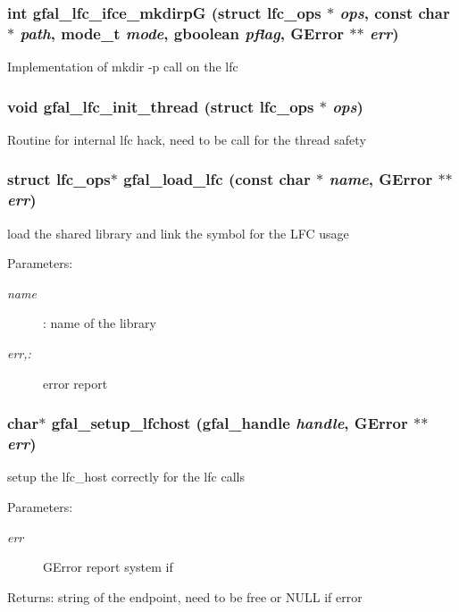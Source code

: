 \subsubsection{\setlength{\rightskip}{0pt plus 5cm}int gfal\_\-lfc\_\-ifce\_\-mkdirp\-G (struct lfc\_\-ops $\ast$ {\em ops}, const char $\ast$ {\em path}, mode\_\-t {\em mode}, gboolean {\em pflag}, GError $\ast$$\ast$ {\em err})}\label{lfc__ifce__ng_8h_9fa43925882e2e196e0020b529827d3c}


Implementation of mkdir -p call on the lfc 
\subsubsection{\setlength{\rightskip}{0pt plus 5cm}void gfal\_\-lfc\_\-init\_\-thread (struct lfc\_\-ops $\ast$ {\em ops})}\label{lfc__ifce__ng_8h_aed5d8ab4c88e918990444e53930bfa4}


Routine for internal lfc hack, need to be call for the thread safety 
\subsubsection{\setlength{\rightskip}{0pt plus 5cm}struct lfc\_\-ops$\ast$ gfal\_\-load\_\-lfc (const char $\ast$ {\em name}, GError $\ast$$\ast$ {\em err})}\label{lfc__ifce__ng_8h_7c91643749a2c5d7e8043c0e42d00fd6}


load the shared library and link the symbol for the LFC usage \begin{Desc}
\item[Parameters:]
\begin{description}
\item[{\em name}]: name of the library \item[{\em err,:}]error report \end{description}
\end{Desc}
\subsubsection{\setlength{\rightskip}{0pt plus 5cm}char$\ast$ gfal\_\-setup\_\-lfchost (gfal\_\-handle {\em handle}, GError $\ast$$\ast$ {\em err})}\label{lfc__ifce__ng_8h_5d13dc09e91f66d74de768c2e4bf4872}


setup the lfc\_\-host correctly for the lfc calls \begin{Desc}
\item[Parameters:]
\begin{description}
\item[{\em err}]GError report system if \end{description}
\end{Desc}
\begin{Desc}
\item[Returns:]string of the endpoint, need to be free or NULL if error \end{Desc}

